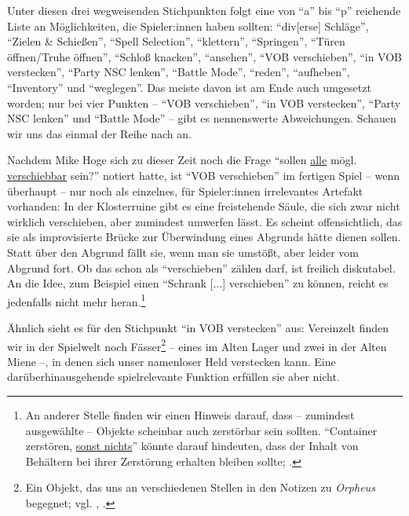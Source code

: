 \documentclass[a5paper,pagesize,numbers=noenddot]{scrbook}
\begin{document}
Unter diesen drei wegweisenden Stichpunkten folgt eine von \enquote{a} bis \enquote{p} reichende Liste an Möglichkeiten, die Spieler:innen haben sollten:
\enquote{div[erse] Schläge}, \enquote{Zielen \& Schießen}, \enquote{Spell Selection}, \enquote{klettern}, \enquote{Springen}, \enquote{Türen öffnen/Truhe öffnen}, \enquote{Schloß knacken}, \enquote{ansehen}, \enquote{VOB verschieben}, \enquote{in VOB verstecken}, \enquote{Party NSC lenken}, \enquote{Battle Mode}, \enquote{reden}, \enquote{aufheben}, \enquote{Inventory} und \enquote{weglegen}.\autocite[S.~1]{orpheus_interface}
Das meiste davon ist am Ende auch umgesetzt worden; nur bei vier Punkten -- \enquote{VOB verschieben}, \enquote{in VOB verstecken}, \enquote{Party NSC lenken} und \enquote{Battle Mode} -- gibt es nennenswerte Abweichungen.
Schauen wir uns das einmal der Reihe nach an.

Nachdem Mike Hoge sich zu dieser Zeit noch die Frage \enquote{sollen \uline{alle} mögl. \uline{verschiebbar} sein?}\autocite[S.~3]{orpheus_interface} notiert hatte, ist \enquote{VOB verschieben} im fertigen Spiel -- wenn überhaupt -- nur noch als einzelnes, für Spieler:innen irrelevantes Artefakt vorhanden:
In der Klosterruine gibt es eine freistehende Säule, die sich zwar nicht wirklich verschieben, aber zumindest umwerfen lässt.
Es scheint offensichtlich, das sie als improvisierte Brücke zur Überwindung eines Abgrunds hätte dienen sollen.
Statt über den Abgrund fällt sie, wenn man sie umstößt, aber leider vom Abgrund fort.
Ob das schon als \enquote{verschieben} zählen darf, ist freilich diskutabel.
An die Idee, zum Beispiel einen \enquote{Schrank [$\ldots$] verschieben}\autocite[S.~3]{orpheus_interface} zu können, reicht es jedenfalls nicht mehr heran.\footnote{An anderer Stelle finden wir einen Hinweis darauf, dass -- zumindest ausgewählte -- Objekte scheinbar auch zerstörbar sein sollten. \enquote{Container zerstören, \uline{sonst nichts}} könnte darauf hindeuten, dass der Inhalt von Behältern bei ihrer Zerstörung erhalten bleiben sollte; \autocite[S.~9]{orpheus_b_scribbles}.}

Ähnlich sieht es für den Stichpunkt \enquote{in VOB verstecken} aus:
Vereinzelt finden wir in der Spielwelt noch Fässer\footnote{Ein Objekt, das uns an verschiedenen Stellen in den Notizen zu \textit{Orpheus} begegnet; vgl. \autocite[S.~19]{orpheus_b_scribbles}, \autocite[S.~6]{orpheus_interface}.} -- eines im Alten Lager und zwei in der Alten Miene --, in denen sich unser namenloser Held verstecken kann.
Eine darüberhinausgehende spielrelevante Funktion erfüllen sie aber nicht.
\end{document}
